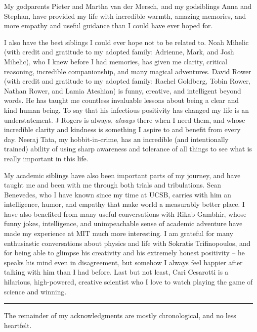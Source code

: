 My godparents Pieter and Martha van der Mersch, and my godsiblings Anna and Stephan, have provided my life with incredible warmth, amazing memories, and more empathy and useful guidance than I could have ever hoped for.



I also have the best siblings I could ever hope not to be related to.
%
Noah Mihelic (with credit and gratitude to my adopted family: Adrienne, Mark, and Josh Mihelic), who I knew before I had memories, has given me clarity, critical reasoning, incredible companionship, and many magical adventures.
%
David Rower (with credit and gratitude to my adopted family: Rachel Goldberg, Tobin Rower, Nathan Rower, and Lamia Ateshian) is funny, creative, and intelligent beyond words.
%
He has taught me countless invaluable lessons about being a clear and kind human being.
%
To say that his infectious positivity has changed my life is an understatement.
%
J Rogers is always, \textit{always} there when I need them, and whose incredible clarity and kindness is something I aspire to and benefit from every day.
%
Neeraj Tata, my hobbit-in-crime, has an incredible (and intentionally trained) ability of using sharp awareness and tolerance of all things to see what is really important in this life.


My academic siblings have also been important parts of my journey, and have taught me and been with me through both trials and tribulations.
%
Sean Benevedes, who I have known since my time at UCSB, carries with him an intelligence, humor, and empathy that make world a measurably better place.
%
I have also benefited from many useful conversations with Rikab Gambhir, whose funny jokes, intelligence, and unimpeachable sense of academic adventure have made my experience at MIT much more interesting.
%
I am grateful for many enthusiastic conversations about physics and life with Sokratis Trifinopoulos, and for being able to glimpse his creativity and his extremely honest positivity -- he speaks his mind even in disagreement, but somehow I always feel happier after talking with him than I had before.
%
Last but not least, Cari Cesarotti is a hilarious, high-powered, creative scientist who I love to watch playing the game of science and winning.



\vspace{10pt}
\hrule
\vspace{10pt}



The remainder of my acknowledgments are mostly chronological, and no less heartfelt.


